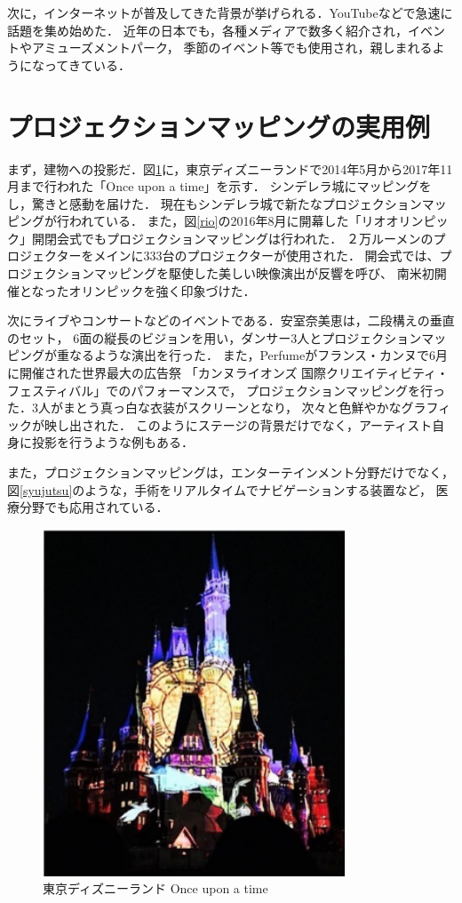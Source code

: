 次に，インターネットが普及してきた背景が挙げられる．YouTubeなどで急速に話題を集め始めた．
近年の日本でも，各種メディアで数多く紹介され，イベントやアミューズメントパーク，
季節のイベント等でも使用され，親しまれるようになってきている\cite{tppm}．



\section{プロジェクションマッピングの実用例}
まず，建物への投影だ．図\ref{disney}に，東京ディズニーランドで2014年5月から2017年11月まで行われた「Once upon a time」を示す．
シンデレラ城にマッピングをし，驚きと感動を届けた．
現在もシンデレラ城で新たなプロジェクションマッピングが行われている\cite{once}．
また，図\ref{rio}の2016年8月に開幕した「リオオリンピック」開閉会式でもプロジェクションマッピングは行われた． 
２万ルーメンのプロジェクターをメインに333台のプロジェクターが使用された．
開会式では、プロジェクションマッピングを駆使した美しい映像演出が反響を呼び、
南米初開催となったオリンピックを強く印象づけた\cite{olympic}．

次にライブやコンサートなどのイベントである．安室奈美恵は，二段構えの垂直のセット，
6面の縦長のビジョンを用い，ダンサー3人とプロジェクションマッピングが重なるような演出を行った\cite{amuro}．
また，Perfumeがフランス・カンヌで6月に開催された世界最大の広告祭
「カンヌライオンズ 国際クリエイティビティ・フェスティバル」でのパフォーマンスで，
プロジェクションマッピングを行った．3人がまとう真っ白な衣装がスクリーンとなり，
次々と色鮮やかなグラフィックが映し出された\cite{kirameku}．
このようにステージの背景だけでなく，アーティスト自身に投影を行うような例もある．

また，プロジェクションマッピングは，エンターテインメント分野だけでなく，
図\ref{syujutsu}のような，手術をリアルタイムでナビゲーションする装置\cite{iryou}など，
医療分野でも応用されている．


\clearpage

\begin{figure}[t]
  \centering
  \includegraphics[width=9cm]{image/disney.png}
  \caption{東京ディズニーランド Once upon a time}
\label{disney}
\end{figure}

